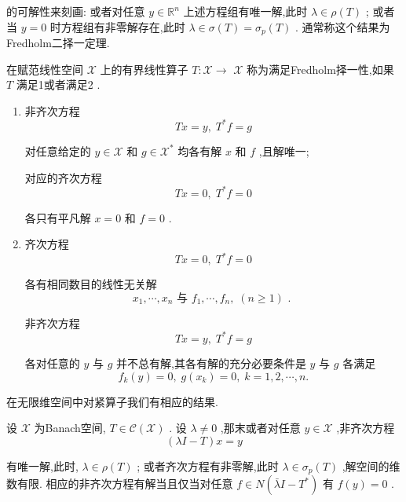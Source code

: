 \documentclass[lang=cn,newtx,10pt,scheme=chinese,thmcnt=chapter]{elegantbook}
\begin{document}
的可解性来刻画: 或者对任意 \(y \in  {\mathbb{R}}^{n}\) 上述方程组有唯一解,此时 \(\lambda  \in  \rho \left( T\right)\) ; 或者当 \(y = 0\) 时方程组有非零解存在,此时 \(\lambda  \in  \sigma \left( T\right)  = {\sigma }_{p}\left( T\right)\) . 通常称这个结果为Fredholm二择一定理.
\begin{definition}[Fredholm择一性]
    在赋范线性空间 \(\mathcal{X}\) 上的有界线性算子 \(T : \mathcal{X} \rightarrow\)  \(\mathcal{X}\) 称为满足Fredholm择一性,如果 \(T\) 满足1或者满足2 .
\begin{enumerate}
    \item 非齐次方程
\begin{equation*}
{Tx} = y,\;{T}^{ * }f = g
\end{equation*}

对任意给定的 \(y \in  \mathcal{X}\) 和 \(g \in  {\mathcal{X}}^{ * }\) 均各有解 \(x\) 和 \(f\) ,且解唯一;

对应的齐次方程
\begin{equation*}
{Tx} = 0,\;{T}^{ * }f = 0
\end{equation*}

各只有平凡解 \(x = 0\) 和 \(f = 0\) .
\item 齐次方程
\begin{equation*}
{Tx} = 0,\;{T}^{ * }f = 0
\end{equation*}

各有相同数目的线性无关解
\begin{equation*}
{x}_{1},\cdots ,{x}_{n}\text{ 与 }{f}_{1},\cdots ,{f}_{n},\;\left( {n \geq  1}\right) \text{ . }
\end{equation*}

非齐次方程
\begin{equation*}
{Tx} = y,\;{T}^{ * }f = g
\end{equation*}

各对任意的 \(y\) 与 \(g\) 并不总有解,其各有解的充分必要条件是 \(y\) 与 \(g\) 各满足
\begin{equation*}
{f}_{k}\left( y\right)  = 0,\;g\left( {x}_{k}\right)  = 0,\;k = 1,2,\cdots ,n.
\end{equation*}

\end{enumerate}



\end{definition}在无限维空间中对紧算子我们有相应的结果.
\begin{theorem}
    设 \(\mathcal{X}\) 为Banach空间, \(T \in  \mathcal{C}\left( \mathcal{X}\right)\) . 设 \(\lambda  \neq  0\) ,那末或者对任意 \(y \in  \mathcal{X}\) ,非齐次方程
\begin{equation*}
\left( {{\lambda I} - T}\right) x = y
\end{equation*}

有唯一解,此时, \(\lambda  \in  \rho \left( T\right)\) ; 或者齐次方程有非零解,此时 \(\lambda  \in  {\sigma }_{p}\left( T\right)\) ,解空间的维数有限. 相应的非齐次方程有解当且仅当对任意 \(f \in  N\left( {\bar{\lambda }I - {T}^{ * }}\right)\) 有 \(f\left( y\right)  = 0\) .
\end{theorem}
\end{document}
